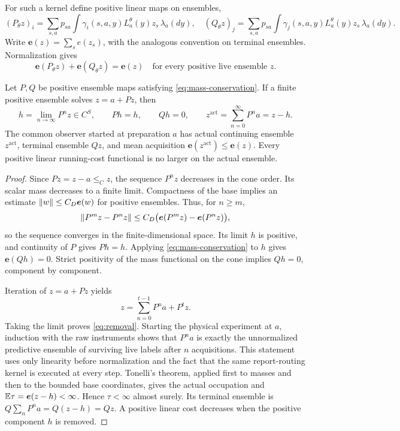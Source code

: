 For such a kernel define positive linear maps on ensembles,
\[
 (P_\theta z)_i=\sum_{s,a}p_{sa}\int\gamma_i(s,a,y)L_a^\theta(y)z_s\,\lambda_a(dy),
 \quad
 (Q_\theta z)_j=\sum_{s,a}p_{sa}\int\gamma_j(s,a,y)L_a^\theta(y)z_s\,\lambda_a(dy).
\]
Write $\boldsymbol e(z)=\sum_s e(z_s)$, with the analogous convention on terminal ensembles. Normalization gives
\begin{equation}\label{eq:mass-conservation}
 \boldsymbol e(P_\theta z)+\boldsymbol e(Q_\theta z)=\boldsymbol e(z)
 \quad\text{for every positive live ensemble }z.
\end{equation}

\begin{lemma}\label{lem:removal}
Let $P,Q$ be positive ensemble maps satisfying \eqref{eq:mass-conservation}. If a finite positive ensemble solves $z=a+Pz$, then
\begin{equation}\label{eq:removal}
 h=\lim_{n\to\infty}P^nz\in C^S,
 \qquad Ph=h,\qquad Qh=0,
 \qquad z^{\mathrm{act}}=\sum_{n=0}^\infty P^na=z-h.
\end{equation}
The common observer started at preparation $a$ has actual continuing ensemble $z^{\mathrm{act}}$, terminal ensemble $Qz$, and mean acquisition $\boldsymbol e(z^{\mathrm{act}})\le\boldsymbol e(z)$. Every positive linear running-cost functional is no larger on the actual ensemble.
\end{lemma}
\begin{proof}
Since $Pz=z-a\le_C z$, the sequence $P^nz$ decreases in the cone order. Its scalar mass decreases to a finite limit. Compactness of the base implies an estimate $\lVert w\rVert\le C_D\boldsymbol e(w)$ for positive ensembles. Thus, for $n\ge m$,
\[
 \lVert P^mz-P^nz\rVert\le C_D\bigl(\boldsymbol e(P^mz)-\boldsymbol e(P^nz)\bigr),
\]
so the sequence converges in the finite-dimensional space. Its limit $h$ is positive, and continuity of $P$ gives $Ph=h$. Applying \eqref{eq:mass-conservation} to $h$ gives $\boldsymbol e(Qh)=0$. Strict positivity of the mass functional on the cone implies $Qh=0$, component by component.

Iteration of $z=a+Pz$ yields
\[
 z=\sum_{n=0}^{t-1}P^na+P^tz.
\]
Taking the limit proves \eqref{eq:removal}. Starting the physical experiment at $a$, induction with the raw instruments shows that $P^na$ is exactly the unnormalized predictive ensemble of surviving live labels after $n$ acquisitions. This statement uses only linearity before normalization and the fact that the same report-routing kernel is executed at every step. Tonelli's theorem, applied first to masses and then to the bounded base coordinates, gives the actual occupation and $\mathbb E\tau=\boldsymbol e(z-h)<\infty$. Hence $\tau<\infty$ almost surely. Its terminal ensemble is $Q\sum_nP^na=Q(z-h)=Qz$. A positive linear cost decreases when the positive component $h$ is removed.
\end{proof}

